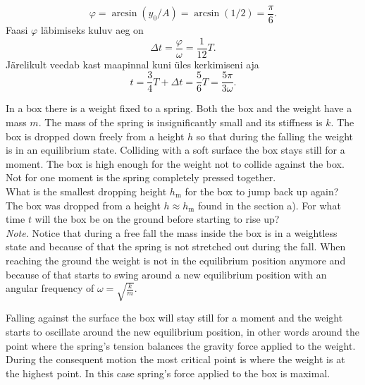 \[
\varphi = \arcsin(y_0/A) = \arcsin(1/2) = \frac{\pi}{6}.
\]
Faasi $\varphi$ läbimiseks kuluv aeg on
\[
\Delta t = \frac{\varphi}{\omega}=\frac{1}{12}T.
\]
Järelikult veedab kast maapinnal kuni üles kerkimiseni aja
\[
t = \frac{3}{4}T + \Delta t = \frac{5}{6}T = \frac{5\pi}{3\omega}.
\]

In a box there is a weight fixed to a spring. Both the box and the weight have a mass $m$. The mass of the spring is insignificantly small and its stiffness is $k$. The box is dropped down freely from a height $h$ so that during the falling the weight is in an equilibrium state. Colliding with a soft surface the box stays still for a moment. The box is high enough for the weight not to collide against the box. Not for one moment is the spring completely pressed together.\\
\osa What is the smallest dropping height $h_\text{m}$ for the box to jump back up again?\\
\osa The box was dropped from a height $h\approx h_\text{m}$ found in the section a). For what time $t$ will the box be on the ground before starting to rise up?\\
\emph{Note.} Notice that during a free fall the mass inside the box is in a weightless state and because of that the spring is not stretched out during the fall. When reaching the ground the weight is not in the equilibrium position anymore and because of that starts to swing around a new equilibrium position with an angular frequency of $\omega =\sqrt{\frac{k}{m}}$.

\hinteng
Falling against the surface the box will stay still for a moment and the weight starts to oscillate around the new equilibrium position, in other words around the point where the spring’s tension balances the gravity force applied to the weight. During the consequent motion the most critical point is where the weight is at the highest point. In this case spring’s force applied to the box is maximal.

